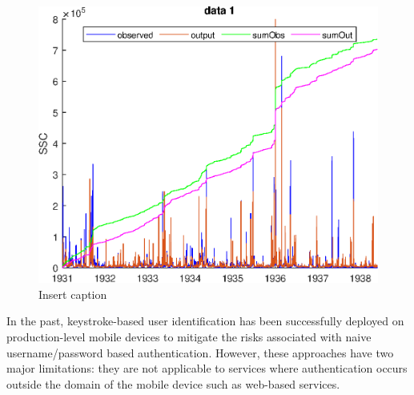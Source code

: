 \documentclass[twocolumn]{article}
\begin{document}
\begin{figure}
	\centering
	\includegraphics{epsFig}
	\caption{Insert caption}
\end{figure}

In the past, keystroke-based user identification has been successfully deployed on production-level mobile devices to mitigate the risks associated with naive username/password based authentication. However, these approaches have two major limitations: they are not applicable to services where authentication occurs outside the domain of the mobile
device such as web-based services.





   
\end{document}
